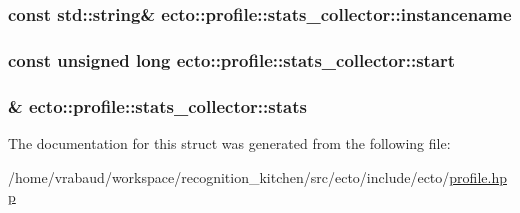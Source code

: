 \subsubsection[{instancename}]{\setlength{\rightskip}{0pt plus 5cm}const std\+::string\& ecto\+::profile\+::stats\+\_\+collector\+::instancename}\label{structecto_1_1profile_1_1stats__collector_ac3d5d7adf91b02719a6b897869683f03}
\hypertarget{structecto_1_1profile_1_1stats__collector_ae607313a8ecc75d6a6ab201cdf7c2d61}{}
\subsubsection[{start}]{\setlength{\rightskip}{0pt plus 5cm}const unsigned long ecto\+::profile\+::stats\+\_\+collector\+::start}\label{structecto_1_1profile_1_1stats__collector_ae607313a8ecc75d6a6ab201cdf7c2d61}
\hypertarget{structecto_1_1profile_1_1stats__collector_a2c206fb60ea04b5162ec43a609f2a185}{}
\subsubsection[{stats}]{\& ecto\+::profile\+::stats\+\_\+collector\+::stats}\label{structecto_1_1profile_1_1stats__collector_a2c206fb60ea04b5162ec43a609f2a185}


The documentation for this struct was generated from the following file\+:\begin{DoxyCompactItemize}
\item 
/home/vrabaud/workspace/recognition\+\_\+kitchen/src/ecto/include/ecto/\hyperlink{profile_8hpp}{profile.\+hpp}\end{DoxyCompactItemize}
